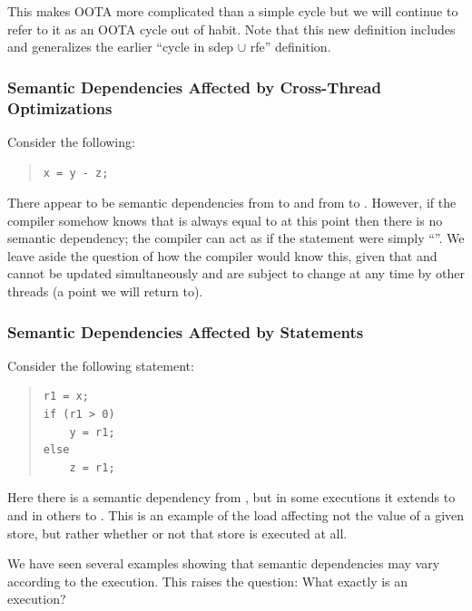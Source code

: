 \documentclass[10]{article}
\begin{document}
\noindent
This makes OOTA more complicated than a simple cycle but
we will continue to refer to it as an OOTA cycle out of habit.
Note that this new definition includes and generalizes the earlier
``cycle in sdep $\cup$ rfe'' definition.

\subsubsection{Semantic Dependencies Affected by Cross-Thread Optimizations}
\label{sec:Semantic Dependencies Affected by Cross-Thread Optimizations}

Consider the following:

\begin{quote}
\begin{verbatim}
x = y - z;
\end{verbatim}
\end{quote}

\noindent
There appear to be semantic dependencies from  to  and from 
to .
However, if the compiler somehow knows that  is
always equal to  at this point then there is no semantic dependency;
the compiler can act as if the statement were simply ``''.
We leave aside the question of how the compiler would know this,
given that  and  cannot be updated simultaneously
and are subject to change at any time by
other threads (a point we will return to).

\subsubsection{Semantic Dependencies Affected by  Statements}
\label{sec:Semantic Dependencies Affected by if Statements}

Consider the following  statement:

\begin{quote}
\begin{verbatim}
r1 = x;
if (r1 > 0)
    y = r1;
else
    z = r1;
\end{verbatim}
\end{quote}

\noindent
Here there is a semantic dependency from , but in some executions
it extends to  and in others to .
This is an example of the load affecting not the value of
a given store, but rather whether or not that store is executed at all.

We have seen several examples showing that semantic dependencies may vary
according to the execution.
This raises the question: What exactly is an execution?
\end{document}
